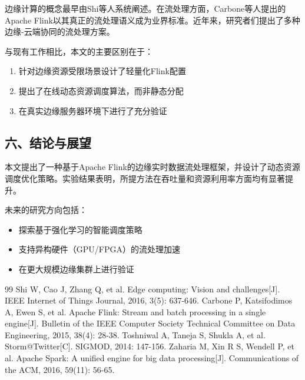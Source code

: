 \documentclass[twocolumn]{harryopo-paper}
\begin{document}
边缘计算的概念最早由Shi等人系统阐述。在流处理方面，Carbone等人提出的Apache Flink以其真正的流处理语义成为业界标准。近年来，研究者们提出了多种边缘-云端协同的流处理方案。

与现有工作相比，本文的主要区别在于：

\begin{enumerate}
  \item 针对边缘资源受限场景设计了轻量化Flink配置
  \item 提出了在线动态资源调度算法，而非静态分配
  \item 在真实边缘服务器环境下进行了充分验证
\end{enumerate}

\subsection*{六、结论与展望}

本文提出了一种基于Apache Flink的边缘实时数据流处理框架，并设计了动态资源调度优化策略。实验结果表明，所提方法在吞吐量和资源利用率方面均有显著提升。

未来的研究方向包括：

\begin{itemize}
  \item 探索基于强化学习的智能调度策略
  \item 支持异构硬件（GPU/FPGA）的流处理加速
  \item 在更大规模边缘集群上进行验证
\end{itemize}

\begin{thebibliography}{99}
 Shi W, Cao J, Zhang Q, et al. Edge computing: Vision and challenges[J]. IEEE Internet of Things Journal, 2016, 3(5): 637-646.
 Carbone P, Katsifodimos A, Ewen S, et al. Apache Flink: Stream and batch processing in a single engine[J]. Bulletin of the IEEE Computer Society Technical Committee on Data Engineering, 2015, 38(4): 28-38.
 Toshniwal A, Taneja S, Shukla A, et al. Storm@Twitter[C]. SIGMOD, 2014: 147-156.
 Zaharia M, Xin R S, Wendell P, et al. Apache Spark: A unified engine for big data processing[J]. Communications of the ACM, 2016, 59(11): 56-65.
\end{thebibliography}
\end{document}
